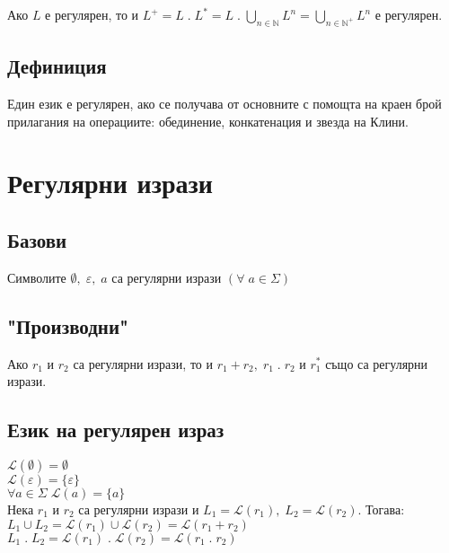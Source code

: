 \documentclass[12pt]{article}
\newcommand{\Lang}{\mathcal{L}}
\newcommand{\N}{\mathbb{N}}
\begin{document}
Ако $L$ е регулярен, то и $L^+ = L \; . \; L^* = L \; . \; \displaystyle\bigcup_{n \in \N} L^n = \displaystyle\bigcup_{n \in \N^+} L^n$ е регулярен.

\subsection*{Дефиниция}

Един език е регулярен, ако се получава от основните с помощта на краен брой прилагания на операциите: обединение, конкатенация и звезда на Клини. 

\section*{Регулярни изрази}

\subsection*{Базови}

Символите $\emptyset, \; \varepsilon, \; a$ са регулярни изрази $(\forall \; a \in \Sigma)$ \\

\subsection*{"Производни"}

Ако $r_1$ и $r_2$ са регулярни изрази, то и $r_1 + r_2, \; r_1 \; . \; r_2$ и $r_1^*$ също са регулярни изрази.

\subsection*{Език на регулярен израз}

$\Lang(\emptyset) = \emptyset$ \\

$\Lang(\varepsilon) = \{\varepsilon\}$ \\

$\forall a \in \Sigma \; \Lang(a) = \{a\}$ \\

Нека $r_1$ и $r_2$ са регулярни изрази и $L_1 = \Lang(r_1), \; L_2 = \Lang(r_2)$. Тогава: \\

$L_1 \cup L_2 = \Lang(r_1) \cup \Lang(r_2) = \Lang(r_1 + r_2)$ \\

$L_1 \; . \; L_2 = \Lang(r_1) \; . \; \Lang(r_2) = \Lang(r_1 \; . \; r_2)$ \\
\end{document}
